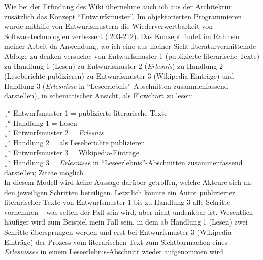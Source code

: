 \documentclass[fontsize=12pt]{scrartcl}
\begin{document}
Wie bei der Erfindung des Wiki \"ubernehme auch ich aus der Architektur zus\"atzlich das Konzept "`Entwurfsmuster"'. Im objektorierten Programmieren wurde mithilfe von Entwurfsmustern die Wieder\-ver\-wert\-bar\-keit von Soft\-ware\-tech\-no\-lo\-gien ver\-bes\-sert (\cite{Stigler2009}:203-212). Das Konzept findet im Rahmen meiner Arbeit da Anwendung, wo ich eine aus meiner Sicht li\-te\-ra\-tur\-vermittelnde Abfolge zu denken versuche: von Entwurfsmuster 1 (pu\-bli\-zierte li\-te\-ra\-rische Texte) zu Handlung 1 (Lesen) zu Entwurfsmuster 2 (\textit{Erlesnis}) zu Handlung 2 (Leseberichte pu\-bli\-zieren) zu Entwurfsmuster 3 (Wi\-ki\-pe\-dia-Eintr\"age) und Handlung 3 (\textit{Erlesnisse} in "`Leseerlebnis"'-Abschnitten zusammenfassend dar\-stel\-len), in schematischer Ansicht, als Flowchart zu lesen: 

¸* Entwurfsmuster 1 = pu\-bli\-zierte literarische Texte\\
¸* Handlung 1 = Lesen\\
¸* Entwurfsmuster 2 = \textit{Erlesnis}\\ 
¸* Handlung 2 = als Leseberichte pu\-bli\-zieren\\
¸* Entwurfsmuster 3 = Wi\-ki\-pe\-dia-Eintr\"age\\
¸* Handlung 3 = \textit{Erlesnisse} in "`Leseerlebnis"'-Abschnitten zusammenfassend dar\-stel\-len; Zitate m\"oglich\\

In diesem Modell wird keine Aussage dar\"uber getroffen, welche Akteure\textsuperscript{\tiny *} sich an den jeweiligen Schritten beteiligen. Letzt\-lich k\"onnte ein Autor\textsuperscript{\tiny *} pu\-bli\-zierter li\-te\-ra\-rischer Texte von Entwurfsmuster 1 bis zu Handlung 3 alle Schritte vornehmen -- was selten der Fall sein wird, aber nicht undenkbar ist. We\-sent\-lich h\"aufiger wird zum Beispiel mein Fall sein, in dem ab Handlung 1 (Lesen) zwei Schritte \"ubersprungen werden und erst bei Entwurfsmuster 3 (Wi\-ki\-pe\-dia-Eintr\"age) der Prozess vom li\-te\-ra\-rischen Text zum Sichtbarmachen eines \textit{Erlesnisses} in einem Leseerlebnis-Abschnitt wieder aufgenommen wird. 
\end{document}
